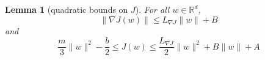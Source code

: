 \documentclass[journal,onecolumn]{IEEEtran}
\newtheorem{lemma}{Lemma}
\newtheorem{proposition}{Proposition}
\newcommand{\grad}{\nabla}
\newcommand{\rew}{J}
\newcommand{\reals}{\mathbb{R}}
\newcommand{\dimn}{N}
\newcommand{\kn}{\kappa_0}
\newcommand{\gibbs}{\ids_{\infty}}
\newcommand{\pconst}{c_P}
\newcommand{\LSconst}{c_{LS}}
\newcommand{\ids}{\pi}
\newcommand{\idistmax}{\bar{\ids}_0}
\newcommand{\specgap}{\lambda}
\newcommand{\tailbound}{M}
\newcommand{\constA}{A}
\newcommand{\constB}{B}
\newcommand{\idiffc}{I}
\newcommand{\dissm}{m}
\newcommand{\dissb}{b}
\newcommand{\lipGJ}{L_{\grad\rew}}
\begin{document}
{


\begin{lemma}[quadratic bounds on $\rew$]
\label{lem:quad_bd}
For all $w \in \reals^d$,
\[\|\grad \rew(w)\| \leq \lipGJ \|w\| + \constB \]
and
\[\frac{\dissm}{3}\|w\|^2 - \frac{\dissb}{2} \leq \rew(w) \leq \frac{\lipGJ}{2}\|w\|^2 + \constB\|w\| + \constA\]
\end{lemma}


}
\end{document}
